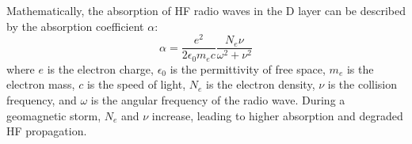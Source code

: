 Mathematically, the absorption of HF radio waves in the D layer can be described by the absorption coefficient $\alpha$:
\[
\alpha = \frac{e^2}{2 \epsilon_0 m_e c} \frac{N_e \nu}{\omega^2 + \nu^2}
\]
where $e$ is the electron charge, $\epsilon_0$ is the permittivity of free space, $m_e$ is the electron mass, $c$ is the speed of light, $N_e$ is the electron density, $\nu$ is the collision frequency, and $\omega$ is the angular frequency of the radio wave. During a geomagnetic storm, $N_e$ and $\nu$ increase, leading to higher absorption and degraded HF propagation.

